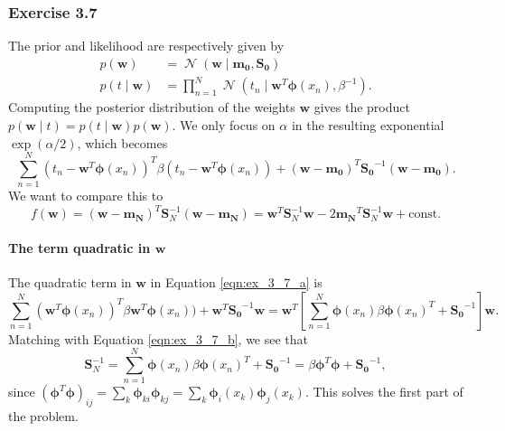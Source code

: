 \documentclass[12pt, a4paper]{article}
\newcommand{\vect}[1]{\bm{#1}}
\DeclareMathOperator{\N}{\mathcal{N}}
\begin{document}
\subsubsection*{Exercise 3.7}
The prior and likelihood are respectively given by
\begin{align*}
	p(\vect{w} ) &= \N (\vect{w} \mid \vect{m_0}, \vect{S_0}) \\
	p(t \mid \vect{w}) &= \prod_{n=1}^{N} \N (t_n \mid \vect{w}^T \vect{\phi} (x_n), \beta^{-1}).
\end{align*}
Computing the posterior distribution of the weights $\vect{w}$ gives the product $p(\vect{w} \mid t) = p(t \mid \vect{w}) p(\vect{w} )$.
We only focus on $\alpha$ in the resulting exponential $\exp(\alpha/2)$, which becomes
\begin{equation}
\label{eqn:ex_3_7_a}
	\sum_{n=1}^{N} (t_n - \vect{w}^T \vect{\phi}(x_n))^T \beta (t_n - \vect{w}^T \vect{\phi}(x_n))
	+
	(\vect{w} - \vect{m_0})^T \vect{S_0}^{-1} (\vect{w} - \vect{m_0}).
\end{equation}
We want to compare this to 
\begin{equation}
\label{eqn:ex_3_7_b}
	f(\vect{w}) = (\vect{w} - \vect{m_N})^T \vect{S}_N^{-1} (\vect{w} - \vect{m_N}) = \vect{w}^T \vect{S}_N^{-1} \vect{w} - 2 \vect{m_N}^T \vect{S}_N^{-1} \vect{w} + \text{const}.
\end{equation}
\paragraph{The term quadratic in $\vect{w}$}
The quadratic term in $\vect{w}$ in Equation \eqref{eqn:ex_3_7_a} is
\begin{equation*}
	\sum_{n=1}^{N} (\vect{w}^T \vect{\phi}(x_n))^T \beta \vect{w}^T \vect{\phi}(x_n))
	+
	\vect{w}^T \vect{S_0}^{-1} \vect{w}
	=
	\vect{w}^T
	\left[ \sum_{n=1}^{N}  \vect{\phi}(x_n) \beta \vect{\phi}(x_n)^T + \vect{S_0}^{-1} \right]
	\vect{w}.
\end{equation*}
Matching with Equation \eqref{eqn:ex_3_7_b}, we see that
\begin{equation*}
	\vect{S}_N^{-1} = \sum_{n=1}^{N}  \vect{\phi}(x_n) \beta \vect{\phi}(x_n)^T + \vect{S_0}^{-1}
	= \beta \vect{\phi}^T \vect{\phi}  + \vect{S_0}^{-1},
\end{equation*}
since $\left( \vect{\phi}^T \vect{\phi} \right)_{ij} = \sum_k \vect{\phi}_{ki} \vect{\phi}_{kj} = \sum_k \vect{\phi}_i (x_k) \vect{\phi}_j (x_k)$.
This solves the first part of the problem.
\end{document}
